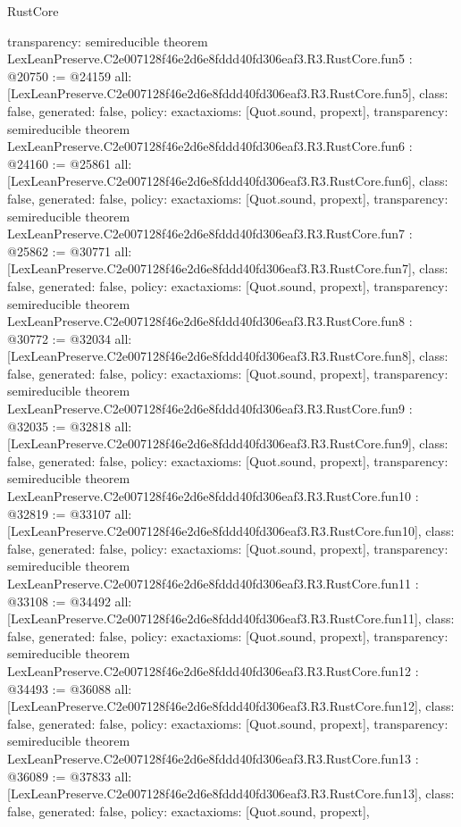 \begin{lexlean}{RustCore}
\begin{coremodule}
{  transparency: semireducible
}
theorem LexLeanPreserve.C2e007128f46e2d6e8fddd40fd306eaf3.R3.RustCore.fun5 : @20750 := @24159 {
  all: [LexLeanPreserve.C2e007128f46e2d6e8fddd40fd306eaf3.R3.RustCore.fun5],
  class: false,
  generated: false,
  policy: exact{axioms: [Quot.sound, propext]},
  transparency: semireducible
}
theorem LexLeanPreserve.C2e007128f46e2d6e8fddd40fd306eaf3.R3.RustCore.fun6 : @24160 := @25861 {
  all: [LexLeanPreserve.C2e007128f46e2d6e8fddd40fd306eaf3.R3.RustCore.fun6],
  class: false,
  generated: false,
  policy: exact{axioms: [Quot.sound, propext]},
  transparency: semireducible
}
theorem LexLeanPreserve.C2e007128f46e2d6e8fddd40fd306eaf3.R3.RustCore.fun7 : @25862 := @30771 {
  all: [LexLeanPreserve.C2e007128f46e2d6e8fddd40fd306eaf3.R3.RustCore.fun7],
  class: false,
  generated: false,
  policy: exact{axioms: [Quot.sound, propext]},
  transparency: semireducible
}
theorem LexLeanPreserve.C2e007128f46e2d6e8fddd40fd306eaf3.R3.RustCore.fun8 : @30772 := @32034 {
  all: [LexLeanPreserve.C2e007128f46e2d6e8fddd40fd306eaf3.R3.RustCore.fun8],
  class: false,
  generated: false,
  policy: exact{axioms: [Quot.sound, propext]},
  transparency: semireducible
}
theorem LexLeanPreserve.C2e007128f46e2d6e8fddd40fd306eaf3.R3.RustCore.fun9 : @32035 := @32818 {
  all: [LexLeanPreserve.C2e007128f46e2d6e8fddd40fd306eaf3.R3.RustCore.fun9],
  class: false,
  generated: false,
  policy: exact{axioms: [Quot.sound, propext]},
  transparency: semireducible
}
theorem LexLeanPreserve.C2e007128f46e2d6e8fddd40fd306eaf3.R3.RustCore.fun10 : @32819 := @33107 {
  all: [LexLeanPreserve.C2e007128f46e2d6e8fddd40fd306eaf3.R3.RustCore.fun10],
  class: false,
  generated: false,
  policy: exact{axioms: [Quot.sound, propext]},
  transparency: semireducible
}
theorem LexLeanPreserve.C2e007128f46e2d6e8fddd40fd306eaf3.R3.RustCore.fun11 : @33108 := @34492 {
  all: [LexLeanPreserve.C2e007128f46e2d6e8fddd40fd306eaf3.R3.RustCore.fun11],
  class: false,
  generated: false,
  policy: exact{axioms: [Quot.sound, propext]},
  transparency: semireducible
}
theorem LexLeanPreserve.C2e007128f46e2d6e8fddd40fd306eaf3.R3.RustCore.fun12 : @34493 := @36088 {
  all: [LexLeanPreserve.C2e007128f46e2d6e8fddd40fd306eaf3.R3.RustCore.fun12],
  class: false,
  generated: false,
  policy: exact{axioms: [Quot.sound, propext]},
  transparency: semireducible
}
theorem LexLeanPreserve.C2e007128f46e2d6e8fddd40fd306eaf3.R3.RustCore.fun13 : @36089 := @37833 {
  all: [LexLeanPreserve.C2e007128f46e2d6e8fddd40fd306eaf3.R3.RustCore.fun13],
  class: false,
  generated: false,
  policy: exact{axioms: [Quot.sound, propext]},
}
\end{coremodule}
\end{lexlean}
